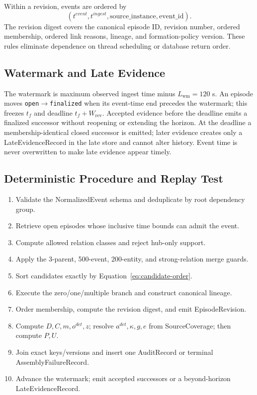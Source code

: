 Within a revision, events are ordered by
\begin{equation}
(t^{event},t^{ingest},
\mathrm{source\_instance},\mathrm{event\_id}).
\end{equation}
The revision digest
covers the canonical episode ID, revision number, ordered membership, ordered link reasons,
lineage, and formation-policy version. These rules eliminate dependence on thread scheduling
or database return order.

\subsection{Watermark and Late Evidence}

The watermark is maximum observed ingest time minus $L_{\mathrm{wm}}=120$ s. An episode moves
\texttt{open}$\rightarrow$\texttt{finalized} when its event-time end precedes the watermark;
this freezes $t_f$ and deadline $t_f+W_{\mathrm{rev}}$. Accepted evidence before the deadline
emits a finalized successor without reopening or extending the horizon. At the deadline a
membership-identical closed successor is emitted; later evidence creates only a
LateEvidenceRecord in the late store and cannot alter history. Event time is never
overwritten to make late evidence appear timely.

\subsection{Deterministic Procedure and Replay Test}

\begin{enumerate}[leftmargin=*,itemsep=1pt,topsep=2pt]
\item Validate the NormalizedEvent schema and deduplicate by root dependency group.
\item Retrieve open episodes whose inclusive time bounds can admit the event.
\item Compute allowed relation classes and reject hub-only support.
\item Apply the 3-parent, 500-event, 200-entity, and strong-relation merge guards.
\item Sort candidates exactly by Equation~\ref{eq:candidate-order}.
\item Execute the zero/one/multiple branch and construct canonical lineage.
\item Order membership, compute the revision digest, and emit EpisodeRevision.
\item Compute $D,C,m,o^{det},z$; resolve $a^{det},\kappa,g,e$ from SourceCoverage; then compute $P,U$.
\item Join exact keys/versions and insert one AuditRecord or terminal AssemblyFailureRecord.
\item Advance the watermark; emit accepted successors or a beyond-horizon LateEvidenceRecord.
\end{enumerate}

